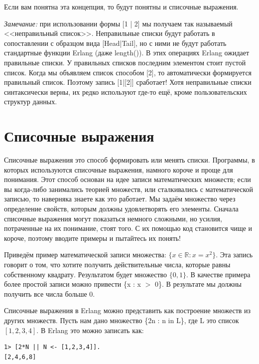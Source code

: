 \documentclass[a4paper,12pt]{report}
\newcommand{\ops}{\colorbox{lgreen}}
\begin{document}
Если вам понятна эта концепция, то будут понятны и списочные выражения.\\ 
\colorbox{lgray}
{
    \begin{minipage}{1.0\linewidth}
        \emph{Замечание:} при использовании формы \ops{[1 | 2]} мы получаем так называемый <<неправильный список>>. Неправильные списки будут работать в сопоставлении с образцом вида \ops{[Head|Tail]}, но с ними не будут работать стандартные функции Erlang (даже \ops{length()}). В этих операциях Erlang ожидает правильные списки. У правильных списков последним элементом стоит пустой список. Когда мы объявляем список способом \ops{[2]}, то автоматически формируется правильный список. Поэтому запись \ops{[1|[2]]} сработает! Хотя неправильные списки синтаксически верны, их редко используют где\--то ещё, кроме пользовательских структур данных.
    \end{minipage}
}
\section{Списочные выражения}
Списочные выражения это способ формировать или менять списки. Программы, в которых используются списочные выражения, намного короче и проще для понимания. Этот способ основан на идее записи математических множеств; если вы когда\--либо занимались теорией множеств, или сталкивались с математической записью, то наверняка знаете как это работает. Мы задаём множество через определение свойств, которым должны удовлетворять его элементы. Сначала списочные выражения могут показаться немного сложными, но усилия, потраченные на их понимание, стоят того. С их помощью код становится чище и короче, поэтому вводите примеры и пытайтесь их понять!

Приведём пример математической записи множества: $\{x \in 
\mathbb{R}: x = x^2\}$. Эта запись говорит о том, что хотите получить действительные числа, которые равны собственному квадрату. Результатом будет множество $\{0, 1\}$. В качестве примера более простой записи можно привести \ops{\{x : x $>$ 0\}}. В результате мы должны получить все числа больше 0.

Списочные выражения в Erlang можно представить как построение множеств из других множеств. Пусть нам дано множество \ops{\{2n : n in L\}}, где L это список $[1, 2, 3, 4]$. В Erlang это можно записать как:\\ 
\begin{lstlisting}[style=repl]
1> [2*N || N <- [1,2,3,4]].
[2,4,6,8]
\end{lstlisting}
\end{document}
